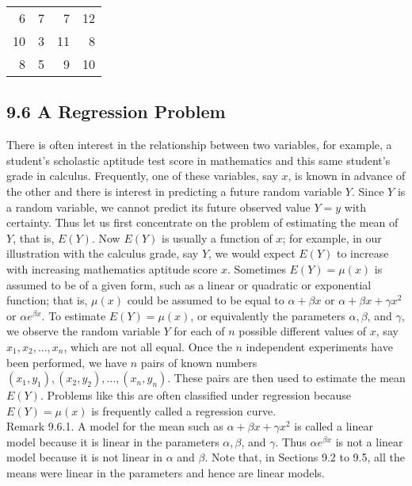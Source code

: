 \begin{center}
\begin{tabular}{rrrr}
6 & 7 & 7 & 12 \\
10 & 3 & 11 & 8 \\
8 & 5 & 9 & 10 \\
\end{tabular}
\end{center}

\subsection*{9.6 A Regression Problem}
There is often interest in the relationship between two variables, for example, a student's scholastic aptitude test score in mathematics and this same student's\\
grade in calculus. Frequently, one of these variables, say $x$, is known in advance of the other and there is interest in predicting a future random variable $Y$. Since $Y$ is a random variable, we cannot predict its future observed value $Y=y$ with certainty. Thus let us first concentrate on the problem of estimating the mean of $Y$, that is, $E(Y)$. Now $E(Y)$ is usually a function of $x$; for example, in our illustration with the calculus grade, say $Y$, we would expect $E(Y)$ to increase with increasing mathematics aptitude score $x$. Sometimes $E(Y)=\mu(x)$ is assumed to be of a given form, such as a linear or quadratic or exponential function; that is, $\mu(x)$ could be assumed to be equal to $\alpha+\beta x$ or $\alpha+\beta x+\gamma x^{2}$ or $\alpha e^{\beta x}$. To estimate $E(Y)=\mu(x)$, or equivalently the parameters $\alpha, \beta$, and $\gamma$, we observe the random variable $Y$ for each of $n$ possible different values of $x$, say $x_{1}, x_{2}, \ldots, x_{n}$, which are not all equal. Once the $n$ independent experiments have been performed, we have $n$ pairs of known numbers $\left(x_{1}, y_{1}\right),\left(x_{2}, y_{2}\right), \ldots,\left(x_{n}, y_{n}\right)$. These pairs are then used to estimate the mean $E(Y)$. Problems like this are often classified under regression because $E(Y)=\mu(x)$ is frequently called a regression curve.\\
Remark 9.6.1. A model for the mean such as $\alpha+\beta x+\gamma x^{2}$ is called a linear model because it is linear in the parameters $\alpha, \beta$, and $\gamma$. Thus $\alpha e^{\beta x}$ is not a linear model because it is not linear in $\alpha$ and $\beta$. Note that, in Sections 9.2 to 9.5, all the means were linear in the parameters and hence are linear models.

